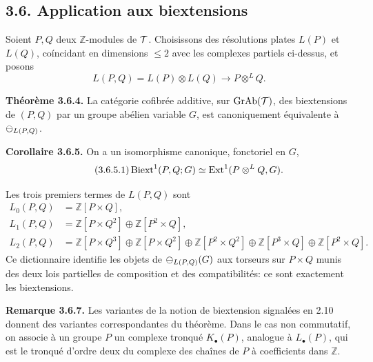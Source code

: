 \documentclass[11pt]{article}
\providecommand{\Ker}{\operatorname{Ker}}
\providecommand{\Z}{\mathbb Z}
\providecommand{\Ext}{\operatorname{Ext}}
\begin{document}
\subsection*{3.6. Application aux biextensions}
Soient \(P,Q\) deux \(\Z\)-modules de \(\cT\).  Choisissons des r\'esolutions plates \(L(P)\) et \(L(Q)\), co\'incidant en dimensions \(\leq2\) avec les complexes partiels ci-dessus, et posons
\begin{equation}\tag{3.6.2}
  L(P,Q)=L(P)\otimes L(Q)\longrightarrow P\otimes^{L}Q.
\end{equation}

\textbf{Th\'eor\`eme 3.6.4.}  La cat\'egorie cofibr\'ee additive, sur \(\GrAb(\cT)\), des biextensions de \((P,Q)\) par un groupe ab\'elien variable \(G\), est canoniquement équivalente \`a \(\mathcal\Psi_{L(P,Q)}\).

\textbf{Corollaire 3.6.5.}  On a un isomorphisme canonique, fonctoriel en \(G\),
\begin{equation}\tag{3.6.5.1}
  \Biext^1(P,Q;G)\simeq \Ext^1(P\otimes^{L}Q,G).
\end{equation}

Les trois premiers termes de \(L(P,Q)\) sont
\begin{align}\tag{3.6.6}
L_0(P,Q)&=\Z[P\times Q],\\
L_1(P,Q)&=\Z[P\times Q^2]\oplus\Z[P^2\times Q],\\
L_2(P,Q)&=\Z[P\times Q^3]\oplus\Z[P\times Q^2]\oplus\Z[P^2\times Q^2]
\oplus\Z[P^3\times Q]\oplus\Z[P^2\times Q].
\end{align}
Ce dictionnaire identifie les objets de \(\mathcal\Psi_{L(P,Q)}(G)\) aux torseurs sur \(P\times Q\) munis des deux lois partielles de composition et des compatibilit\'es: ce sont exactement les biextensions.

\textbf{Remarque 3.6.7.}  Les variantes de la notion de biextension signal\'ees en 2.10 donnent des variantes correspondantes du th\'eor\`eme.  Dans le cas non commutatif, on associe \`a un groupe \(P\) un complexe tronqu\'e \(K_\bullet(P)\), analogue \`a \(L_\bullet(P)\), qui est le tronqu\'e d'ordre deux du complexe des cha\^ines de \(P\) \`a coefficients dans \(\Z\).



\providecommand{\Biext}{\operatorname{Biext}}
\providecommand{\Ext}{\operatorname{Ext}}
\providecommand{\Torop}{\operatorname{Tor}}
\providecommand{\GRAB}{\operatorname{GRAB}}
\providecommand{\RHom}{\operatorname{RHom}}
\providecommand{\Ker}{\operatorname{Ker}}
\providecommand{\coker}{\operatorname{coker}}
\providecommand{\cK}{\mathcal K}
\providecommand{\cL}{\mathcal L}
\providecommand{\cM}{\mathcal M}
\providecommand{\cT}{\mathcal T}
\providecommand{\dfn}{\mathrel{\mathrm{dfn}}}
\end{document}
